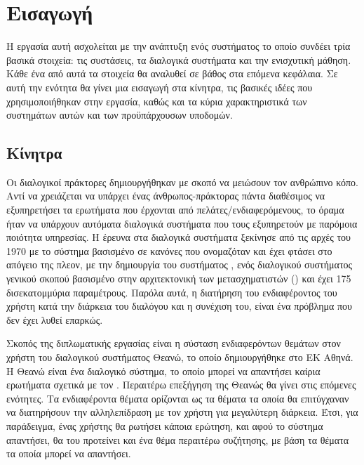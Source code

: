 \chapter{Εισαγωγή}

Η εργασία αυτή ασχολείται με την ανάπτυξη ενός συστήματος το οποίο συνδέει τρία βασικά στοιχεία:
τις συστάσεις, τα διαλογικά συστήματα και την ενισχυτική μάθηση.
Κάθε ένα από αυτά τα στοιχεία θα αναλυθεί σε βάθος στα επόμενα κεφάλαια.
Σε αυτή την ενότητα θα γίνει μια εισαγωγή στα κίνητρα, τις βασικές ιδέες που χρησιμοποιήθηκαν στην εργασία,
καθώς και τα κύρια χαρακτηριστικά των συστημάτων αυτών και των προϋπάρχουσων υποδομών.


\section{Κίνητρα}

Οι διαλογικοί πράκτορες δημιουργήθηκαν με σκοπό να μειώσουν τον ανθρώπινο κόπο.
Αντί να χρειάζεται να υπάρχει ένας άνθρωπος-πράκτορας πάντα διαθέσιμος να εξυπηρετήσει τα ερωτήματα που έρχονται από πελάτες/ενδιαφερόμενους,
το όραμα ήταν να υπάρχουν αυτόματα διαλογικά συστήματα που τους εξυπηρετούν με παρόμοια ποιότητα υπηρεσίας. Η έρευνα στα διαλογικά συστήματα
ξεκίνησε από τις αρχές του 1970 με το σύστημα βασισμένο σε κανόνες που ονομαζόταν \cite{eliza} και έχει φτάσει στο απόγειο της πλεον, με την
δημιουργία του συστήματος , ενός διαλογικού συστήματος γενικού σκοπού βασισμένο στην αρχιτεκτονική των μετασχηματιστών ()
και έχει 175 δισεκατομμύρια παραμέτρους\cite{brown2020language}. Παρόλα αυτά, η διατήρηση του ενδιαφέροντος του χρήστη κατά την διάρκεια του διαλόγου και η συνέχιση του, είναι
ένα πρόβλημα που δεν έχει λυθεί επαρκώς.

Σκοπός της διπλωματικής εργασίας είναι η σύσταση ενδιαφερόντων θεμάτων στον χρήστη του διαλογικού συστήματος Θεανώ, το οποίο δημιουργήθηκε στο ΕΚ Αθηνά. Η
Θεανώ είναι ένα διαλογικό σύστημα, το οποίο μπορεί να απαντήσει καίρια ερωτήματα σχετικά με τον . Περαιτέρω επεξήγηση της Θεανώς
θα γίνει στις επόμενες ενότητες. Τα ενδιαφέροντα θέματα ορίζονται ως τα θέματα τα οποία θα επιτύγχαναν να διατηρήσουν την αλληλεπίδραση με τον χρήστη για μεγαλύτερη διάρκεια.
Έτσι, για παράδειγμα, ένας χρήστης θα ρωτήσει κάποια ερώτηση, και αφού το σύστημα απαντήσει,
θα του προτείνει και ένα θέμα περαιτέρω συζήτησης, με βάση τα θέματα τα οποία μπορεί να απαντήσει.

